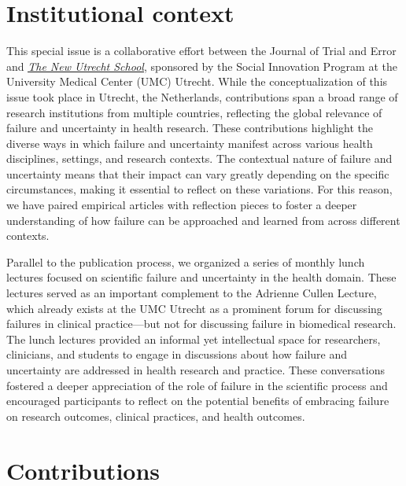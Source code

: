 \documentclass[authordate, empirical, issue]{jote-new-article}
\begin{document}
	\section{Institutional context}



	This special issue is a collaborative effort between the Journal of Trial and Error and \emph{\underline{\href{https://www.uu.nl/en/research/the-new-utrecht-school}{The New Utrecht School}}}, sponsored by the Social Innovation Program at the University Medical Center (UMC) Utrecht. While the conceptualization of this issue took place in Utrecht, the Netherlands, contributions span a broad range of research institutions from multiple countries, reflecting the global relevance of failure and uncertainty in health research. These contributions highlight the diverse ways in which failure and uncertainty manifest across various health disciplines, settings, and research contexts. The contextual nature of failure and uncertainty means that their impact can vary greatly depending on the specific circumstances, making it essential to reflect on these variations. For this reason, we have paired empirical articles with reflection pieces to foster a deeper understanding of how failure can be approached and learned from across different contexts.



	Parallel to the publication process, we organized a series of monthly lunch lectures focused on scientific failure and uncertainty in the health domain. These lectures served as an important complement to the Adrienne Cullen Lecture, which already exists at the UMC Utrecht as a prominent forum for discussing failures in clinical practice—but not for discussing failure in biomedical research. The lunch lectures provided an informal yet intellectual space for researchers, clinicians, and students to engage in discussions about how failure and uncertainty are addressed in health research and practice. These conversations fostered a deeper appreciation of the role of failure in the scientific process and encouraged participants to reflect on the potential benefits of embracing failure on research outcomes, clinical practices, and health outcomes.







	\section{Contributions }
\end{document}
